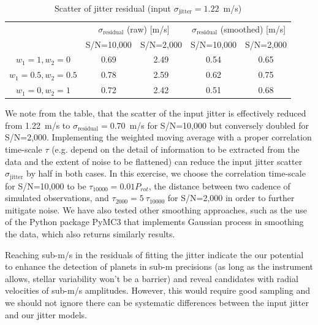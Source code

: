 \begin{table}[htbp]
\centering
\begin{tabular}{|c|c|c|c|c|}
\hline
\multirow{2}{*}{} 	& \multicolumn{2}{c|}{$\sigma_\text{residual}$ (raw) [m/s]}  & \multicolumn{2}{c|}{$\sigma_\text{residual}$ (smoothed) [m/s]}  \\ \cline{2-5} 
                  	& \multicolumn{1}{l|}{S/N=10,000} & \multicolumn{1}{l|}{S/N=2,000} & \multicolumn{1}{l|}{S/N=10,000} & \multicolumn{1}{l|}{S/N=2,000} \\ \hline
$w_1=1, w_2=0$  	 	& 0.69 		& 2.49 			& 0.54 			& 0.65                              \\ \hline
$w_1=0.5, w_2=0.5$  & 0.78 		& 2.59			& 0.62			& 0.75                              \\ \hline
$w_1=0, w_2=1$      & 0.72		& 2.42			& 0.51 			& 0.68                              \\ \hline
\end{tabular}
\caption{Scatter of jitter residual (input $\sigma_\text{jitter} = 1.22$~m/s)}
\label{table:jitter_model_scatter}
\end{table}

We note from the table, that the scatter of the input jitter is effectively reduced from 1.22~m/s to $\sigma_\text{residual} = 0.70$~m/s for S/N=10,000 but conversely doubled for S/N=2,000. Implementing the weighted moving average with a proper correlation time-scale $\tau$ (e.g. depend on the detail of information to be extracted from the data and the extent of noise to be flattened) can reduce the input jitter scatter $\sigma_\text{jitter}$ by half in both cases. In this exercise, we choose the correlation time-scale for S/N=10,000 to be $\tau_{10000} = 0.01 P_{rot}$, the distance between two cadence of simulated observations, and $\tau_{2000} = 5~\tau_{10000}$ for S/N=2,000 in order to further mitigate noise. We have also tested other smoothing approaches, such as the use of the Python package PyMC3 that implements Gaussian process in smoothing the data, which also returns similarly results. 

Reaching sub-m/s in the residuals of fitting the jitter indicate the our potential to enhance the detection of planets in sub-m precisions (as long as the instrument allows, stellar variability won't be a barrier) and reveal candidates with radial velocities of sub-m/s amplitudes. However, this would require good sampling and we should not ignore there can be systematic differences between the input jitter and our jitter models.

